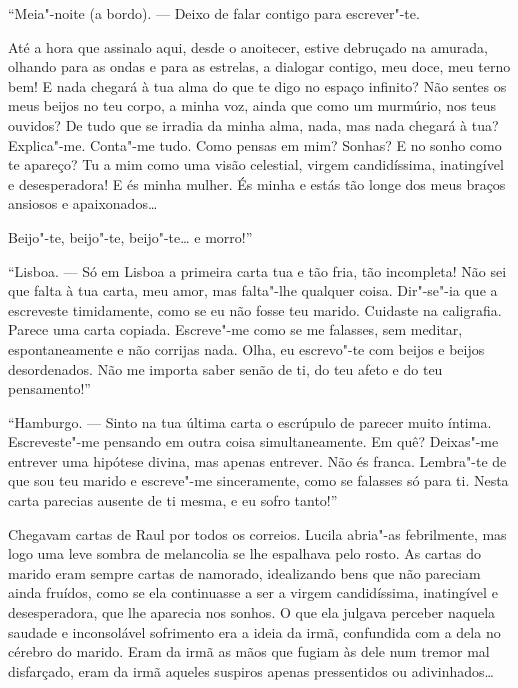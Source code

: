 \dotfill{}

``Meia"-noite (a bordo). --- Deixo de falar contigo para escrever"-te.

Até a hora que assinalo aqui, desde o anoitecer, estive debruçado na
amurada, olhando para as ondas e para as estrelas, a dialogar contigo,
meu doce, meu terno bem! E nada chegará à tua alma do que te digo no
espaço infinito? Não sentes os meus beijos no teu corpo, a minha voz,
ainda que como um murmúrio, nos teus ouvidos? De tudo que se irradia da
minha alma, nada, mas nada chegará à tua? Explica"-me. Conta"-me tudo.
Como pensas em mim? Sonhas? E no sonho como te apareço? Tu a mim como
uma visão celestial, virgem candidíssima, inatingível e desesperadora! E
és minha mulher. És minha e estás tão longe dos meus braços ansiosos e
apaixonados\ldots{}

Beijo"-te, beijo"-te, beijo"-te\ldots{} e morro!''

\dotfill{}

``Lisboa. --- Só em Lisboa a primeira carta tua e tão fria, tão
incompleta! Não sei que falta à tua carta, meu amor, mas falta"-lhe
qualquer coisa. Dir"-se"-ia que a escreveste timidamente, como se eu não
fosse teu marido. Cuidaste na caligrafia. Parece uma carta copiada.
Escreve"-me como se me falasses, sem meditar, espontaneamente e não
corrijas nada. Olha, eu escrevo"-te com beijos e beijos desordenados. Não
me importa saber senão de ti, do teu afeto e do teu pensamento!''

\dotfill{}

``Hamburgo. --- Sinto na tua última carta o escrúpulo de parecer muito
íntima. Escreveste"-me pensando em outra coisa simultaneamente. Em quê?
Deixas"-me entrever uma hipótese divina, mas apenas entrever. Não és
franca. Lembra"-te de que sou teu marido e escreve"-me sinceramente, como
se falasses só para ti. Nesta carta parecias ausente de ti mesma, e eu
sofro tanto!''

\dotfill{}

Chegavam cartas de Raul por todos os correios. Lucila abria"-as
febrilmente, mas logo uma leve sombra de melancolia se lhe espalhava
pelo rosto. As cartas do marido eram sempre cartas de namorado,
idealizando bens que não pareciam ainda fruídos, como se ela continuasse
a ser a virgem candidíssima, inatingível e desesperadora, que lhe
aparecia nos sonhos. O que ela julgava perceber naquela saudade e
inconsolável sofrimento era a ideia da irmã, confundida com a dela no
cérebro do marido. Eram da irmã as mãos que fugiam às dele num tremor
mal disfarçado, eram da irmã aqueles suspiros apenas pressentidos ou
adivinhados\ldots{}

